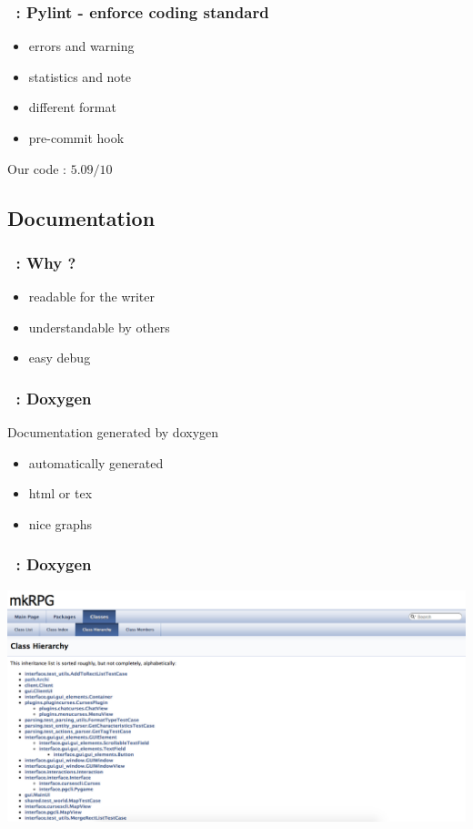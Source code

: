 \documentclass[11pt]{beamer}
\begin{document}
\begin{frame}
    \frametitle{\secname~: Pylint - enforce coding standard}
    \begin{itemize}
        \item errors and warning
        \item statistics and note 
        \item different format
        \item pre-commit hook 
    \end{itemize}  
    Our code : $5.09/10$
\end{frame}

\subsection{Documentation}
\begin{frame}
    \frametitle{\secname~: Why ?}
    \begin{itemize}
        \item readable for the writer
        \item understandable by others 
        \item easy debug
    \end{itemize}
\end{frame}

\begin{frame}
    \frametitle{\secname~: Doxygen}
    Documentation generated by doxygen
    \begin{itemize}
    	\item automatically generated
        \item html or tex
        \item nice graphs
    \end{itemize}
\end{frame}

\begin{frame}
    \frametitle{\secname~: Doxygen}
\includegraphics[scale=0.3]{doxygen}
\end{frame}
\end{document}
